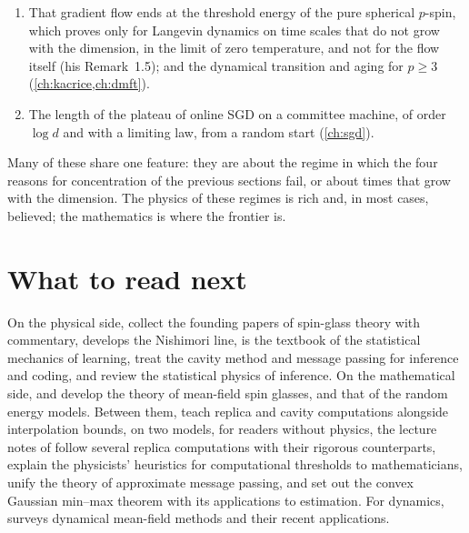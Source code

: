 \begin{refsection}
\begin{enumerate}
\item That gradient flow ends at the threshold energy of the pure spherical $p$-spin, which \textcite{Sellke2024} proves only for Langevin dynamics on time scales that do not grow with the dimension, in the limit of zero temperature, and not for the flow itself (his Remark~1.5); and the dynamical transition and aging for $p\ge3$ (\cref{ch:kacrice,ch:dmft}).
\item The length of the plateau of online SGD on a committee machine, of order $\log d$ and with a limiting law, from a random start \parencite[Section~3]{VeigaEtAl2022} (\cref{ch:sgd}).
\end{enumerate}
Many of these share one feature: they are about the regime in which the four reasons for concentration of the previous sections fail, or about times that grow with the dimension. The physics of these regimes is rich and, in most cases, believed; the mathematics is where the frontier is.

\section*{What to read next}

On the physical side, \textcite{MezardParisiVirasoro1987} collect the founding papers of spin-glass theory with commentary, \textcite{Nishimori2001} develops the Nishimori line, \textcite{EngelVandenBroeck2001} is the textbook of the statistical mechanics of learning, \textcite{MezardMontanari2009} treat the cavity method and message passing for inference and coding, and \textcite{ZdeborovaKrzakala2016} review the statistical physics of inference. On the mathematical side, \textcite{Talagrand2011a,Talagrand2011b} and \textcite{Panchenko2013b} develop the theory of mean-field spin glasses, and \textcite{Bovier2006} that of the random energy models. Between them, \textcite{MontanariSen2024} teach replica and cavity computations alongside interpolation bounds, on two models, for readers without physics, the lecture notes of \textcite{KrzakalaZdeborova2024} follow several replica computations with their rigorous counterparts, \textcite{BandeiraPerryWein2018} explain the physicists' heuristics for computational thresholds to mathematicians, \textcite{FengEtAl2022} unify the theory of approximate message passing, and \textcite{ThrampoulidisAbbasiHassibi2018} set out the convex Gaussian min--max theorem with its applications to estimation. For dynamics, \textcite{Cugliandolo2024} surveys dynamical mean-field methods and their recent applications.

\printchapterbib
\end{refsection}
\rstfloatrestore
